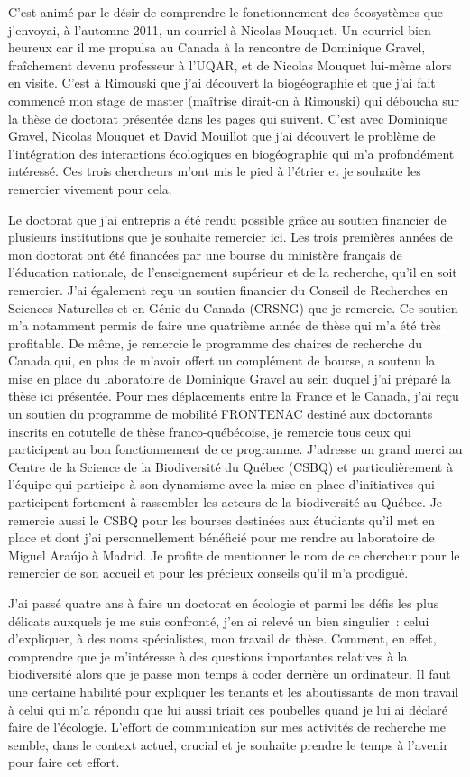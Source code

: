 C'est animé par le désir de comprendre le fonctionnement des écosystèmes
que j'envoyai, à l'automne 2011, un courriel à Nicolas Mouquet. Un
courriel bien heureux car il me propulsa au Canada à la rencontre de
Dominique Gravel, fraîchement devenu professeur à l'UQAR, et de Nicolas
Mouquet lui-même alors en visite. C'est à Rimouski que j'ai découvert la
biogéographie et que j'ai fait commencé mon stage de master (maîtrise
dirait-on à Rimouski) qui déboucha sur la thèse de doctorat présentée
dans les pages qui suivent. C'est avec Dominique Gravel, Nicolas Mouquet
et David Mouillot que j'ai découvert le problème de l'intégration des
interactions écologiques en biogéographie qui m'a profondément
intéressé. Ces trois chercheurs m'ont mis le pied à l'étrier et je
souhaite les remercier vivement pour cela.

Le doctorat que j'ai entrepris a été rendu possible grâce au soutien
financier de plusieurs institutions que je souhaite remercier ici. Les
trois premières années de mon doctorat ont été financées par une bourse
du ministère français de l'éducation nationale, de l'enseignement
supérieur et de la recherche, qu'il en soit remercier. J'ai également
reçu un soutien financier du Conseil de Recherches en Sciences
Naturelles et en Génie du Canada (CRSNG) que je remercie. Ce soutien m'a
notamment permis de faire une quatrième année de thèse qui m'a été très
profitable. De même, je remercie le programme des chaires de recherche
du Canada qui, en plus de m'avoir offert un complément de bourse, a
soutenu la mise en place du laboratoire de Dominique Gravel au sein
duquel j'ai préparé la thèse ici présentée. Pour mes déplacements entre
la France et le Canada, j'ai reçu un soutien du programme de mobilité
FRONTENAC destiné aux doctorants inscrits en cotutelle de thèse
franco-québécoise, je remercie tous ceux qui participent au bon
fonctionnement de ce programme. J'adresse un grand merci au Centre de la
Science de la Biodiversité du Québec (CSBQ) et particulièrement à
l'équipe qui participe à son dynamisme avec la mise en place
d'initiatives qui participent fortement à rassembler les acteurs de la
biodiversité au Québec. Je remercie aussi le CSBQ pour les bourses
destinées aux étudiants qu'il met en place et dont j'ai personnellement
bénéficié pour me rendre au laboratoire de Miguel Araújo à Madrid. Je
profite de mentionner le nom de ce chercheur pour le remercier de son
accueil et pour les précieux conseils qu'il m'a prodigué.

J'ai passé quatre ans à faire un doctorat en écologie et parmi les défis
les plus délicats auxquels je me suis confronté, j'en ai relevé un bien
singulier~: celui d'expliquer, à des noms spécialistes, mon travail de
thèse. Comment, en effet, comprendre que je m'intéresse à des questions
importantes relatives à la biodiversité alors que je passe mon temps à
coder derrière un ordinateur. Il faut une certaine habilité pour
expliquer les tenants et les aboutissants de mon travail à celui qui m'a
répondu que lui aussi triait ces poubelles quand je lui ai déclaré faire
de l'écologie. L'effort de communication sur mes activités de recherche
me semble, dans le context actuel, crucial et je souhaite prendre le
temps à l'avenir pour faire cet effort.

